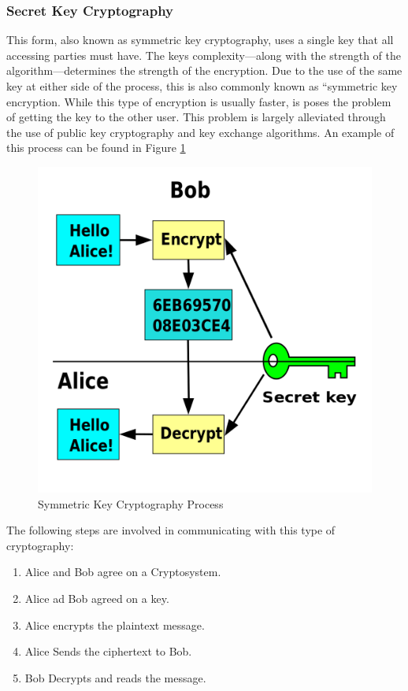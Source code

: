 			\subsubsection{Secret Key Cryptography}
				This form, also known as symmetric key cryptography,  uses a single key that all accessing parties must have. 
				The keys complexity---along with the strength of the algorithm---determines the strength of the encryption.
				Due to the use of the same key at either side of the process, this is also commonly known as ``symmetric key encryption. 
				While this type of encryption is usually faster, is poses the problem of getting the key to the other user. 
				This problem is largely alleviated through the use of public key cryptography and key exchange algorithms.
				An example of this process can be found in Figure \ref{fig:SymmetricKey}
				\begin{figure}[htb]
					\centering
					\includegraphics[scale=0.25]{./SymmetricKey.png}
					\caption{Symmetric Key Cryptography Process}
					\label{fig:SymmetricKey}
				\end{figure}
				The following steps are involved in communicating with this type of cryptography:
				\begin{enumerate}
					\item Alice and Bob agree on a Cryptosystem. 
					\item Alice ad Bob agreed on a key. 
					\item Alice encrypts the plaintext message. 
					\item Alice Sends the ciphertext to Bob. 
					\item Bob Decrypts and reads the message.
				\end{enumerate}

